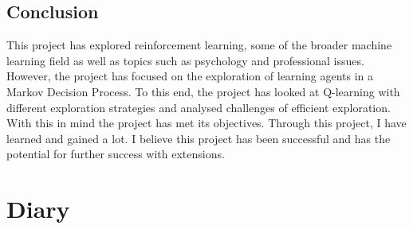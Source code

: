 \documentclass[]{final_report}
\begin{document}
\section{Conclusion}

This project has explored reinforcement learning, some of the broader machine learning field as well as topics such as psychology and professional issues. However, the project has focused on the exploration of learning agents in a Markov Decision Process. To this end, the project has looked at Q-learning with different exploration strategies and analysed challenges of efficient exploration. With this in mind the project has met its objectives. Through this project, I have learned and gained a lot. I believe this project has been successful and has the potential for further success with extensions. 

\newpage




\appendix

\chapter{Diary}

% 



\label{endpage}
\end{document}
